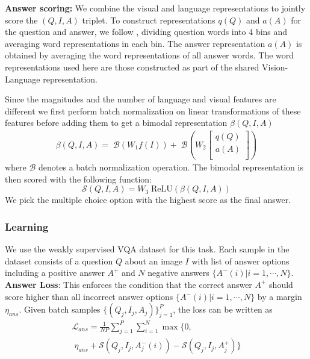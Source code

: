 \documentclass[10pt,twocolumn,letterpaper]{article}
\begin{document}
\noindent
\textbf{Answer scoring:} We combine the visual and language representations to jointly score the $(Q,I, A)$ triplet. To construct representations $q(Q)$ and $a(A)$ for the question and answer, we follow \cite{shih2016look}, dividing question words into 4 bins and averaging word representations in each bin. The answer representation $a(A)$ is obtained by averaging the word representations of all answer words. The word representations used here are those constructed as part of the shared Vision-Language representation. %

Since the magnitudes and the number of language and visual features are different we first perform batch normalization on linear transformations of these features before adding them to get a bimodal representation $\beta(Q,I,A)$
\begin{multline}\label{eq:bimodal_pool}
\beta(Q,I,A) = \;\mathcal{B}(W_1f(I)) 
+ \;\mathcal{B}\left(W_2 
\begin{bmatrix}
q(Q) \\
a(A) \\
\end{bmatrix}
\right)
\end{multline}
where $\mathcal{B}$ denotes a batch normalization operation.
\noindent
The bimodal representation is then scored with the following function: 
\begin{equation}
\mathcal{S}(Q,I,A) = W_3 \; \text{ReLU}(\beta(Q,I,A))
\end{equation}
\noindent
We pick the multiple choice option with the highest score as the final answer.

\subsubsection{Learning}\label{sec:vqa_learn}
We use the weakly supervised VQA dataset \cite{antol2015vqa} for this task. Each sample in the dataset consists of a question $Q$ about an image $I$ with list of answer options including a positive answer $A^{+}$ and $N$ negative answers $\{A^{-}(i) | i=1,\cdots, N\}$. \\

\noindent
\textbf{Answer Loss}: This enforces the condition that the correct answer $A^{+}$ should score higher than all incorrect answer options $\{A^{-}(i) | i=1,\cdots, N\}$ by a margin $\eta_{ans}$. Given batch samples $\{(Q_j,I_j,A_j)\}_{j=1}^{P}$, the loss can be written as 
\begin{multline}
\mathcal{L}_{ans} = \frac{1}{NP}\sum_{j=1}^{P}
\sum_{i=1}^{N} \max\{0,\\\;\eta_{ans} + \mathcal{S}(Q_j,I_j,A_j^{-}(i)) - \mathcal{S}(Q_j,I_j,A_j^{+})\}
\end{multline}
\end{document}
